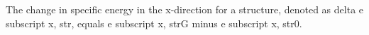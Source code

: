 The change in specific energy in the x-direction for a structure, denoted as delta e subscript x, str, equals e subscript x, strG minus e subscript x, str0.